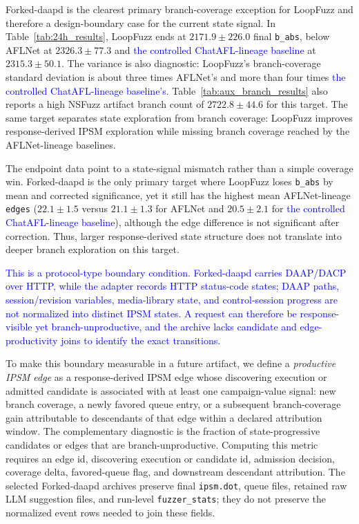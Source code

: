 \documentclass[final,5p,times,number]{elsarticle}
\begin{document}
Forked-daapd is the clearest primary branch-coverage exception for LoopFuzz and therefore a design-boundary case for the current state signal. In Table~\ref{tab:24h_results}, LoopFuzz ends at $2171.9{\pm}226.0$ final \texttt{b\_abs}, below AFLNet at $2326.3{\pm}77.3$ and \textcolor{blue}{the controlled ChatAFL-lineage baseline} at $2315.3{\pm}50.1$. The variance is also diagnostic: LoopFuzz's branch-coverage standard deviation is about three times AFLNet's and more than four times \textcolor{blue}{the controlled ChatAFL-lineage baseline's}. Table~\ref{tab:aux_branch_results} also reports a high NSFuzz artifact branch count of $2722.8{\pm}44.6$ for this target. The same target separates state exploration from branch coverage: LoopFuzz improves response-derived IPSM exploration while missing branch coverage reached by the AFLNet-lineage baselines.

The endpoint data point to a state-signal mismatch rather than a simple coverage win. Forked-daapd is the only primary target where LoopFuzz loses \texttt{b\_abs} by mean and corrected significance, yet it still has the highest mean AFLNet-lineage \texttt{edges} ($22.1{\pm}1.5$ versus $21.1{\pm}1.3$ for AFLNet and $20.5{\pm}2.1$ for \textcolor{blue}{the controlled ChatAFL-lineage baseline}), although the edge difference is not significant after correction. Thus, larger response-derived state structure does not translate into deeper branch exploration on this target.

\textcolor{blue}{This is a protocol-type boundary condition. Forked-daapd carries DAAP/DACP over HTTP, while the adapter records HTTP status-code states; DAAP paths, session/revision variables, media-library state, and control-session progress are not normalized into distinct IPSM states. A request can therefore be response-visible yet branch-unproductive, and the archive lacks candidate and edge-productivity joins to identify the exact transitions.}

To make this boundary measurable in a future artifact, we define a \emph{productive IPSM edge} as a response-derived IPSM edge whose discovering execution or admitted candidate is associated with at least one campaign-value signal: new branch coverage, a newly favored queue entry, or a subsequent branch-coverage gain attributable to descendants of that edge within a declared attribution window. The complementary diagnostic is the fraction of state-progressive candidates or edges that are branch-unproductive. Computing this metric requires an edge id, discovering execution or candidate id, admission decision, coverage delta, favored-queue flag, and downstream descendant attribution. The selected Forked-daapd archives preserve final \texttt{ipsm.dot}, queue files, retained raw LLM suggestion files, and run-level \texttt{fuzzer\_stats}; they do not preserve the normalized event rows needed to join these fields.
\end{document}

